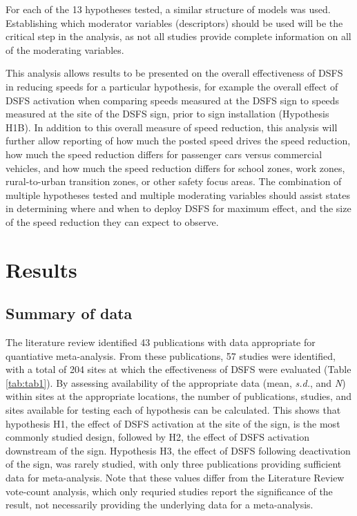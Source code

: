 \documentclass[]{article}
\begin{document}
For each of the 13 hypotheses tested, a similar structure of models was
used. Establishing which moderator variables (descriptors) should be
used will be the critical step in the analysis, as not all studies
provide complete information on all of the moderating variables.

This analysis allows results to be presented on the overall
effectiveness of DSFS in reducing speeds for a particular hypothesis,
for example the overall effect of DSFS activation when comparing speeds
measured at the DSFS sign to speeds measured at the site of the DSFS
sign, prior to sign installation (Hypothesis H1B). In addition to this
overall measure of speed reduction, this analysis will further allow
reporting of how much the posted speed drives the speed reduction, how
much the speed reduction differs for passenger cars versus commercial
vehicles, and how much the speed reduction differs for school zones,
work zones, rural-to-urban transition zones, or other safety focus
areas. The combination of multiple hypotheses tested and multiple
moderating variables should assist states in determining where and when
to deploy DSFS for maximum effect, and the size of the speed reduction
they can expect to observe.

\section{Results}\label{results}

\subsection{Summary of data}\label{summary-of-data}

The literature review identified 43 publications with data appropriate
for quantiative meta-analysis. From these publications, 57 studies were
identified, with a total of 204 sites at which the effectiveness of DSFS
were evaluated (Table \ref{tab:tab1}). By assessing availability of the
appropriate data (mean, \emph{s.d.}, and \emph{N}) within sites at the
appropriate locations, the number of publications, studies, and sites
available for testing each of hypothesis can be calculated. This shows
that hypothesis H1, the effect of DSFS activation at the site of the
sign, is the most commonly studied design, followed by H2, the effect of
DSFS activation downstream of the sign. Hypothesis H3, the effect of
DSFS following deactivation of the sign, was rarely studied, with only
three publications providing sufficient data for meta-analysis. Note
that these values differ from the Literature Review vote-count analysis,
which only requried studies report the significance of the result, not
necessarily providing the underlying data for a meta-analysis.
\end{document}
